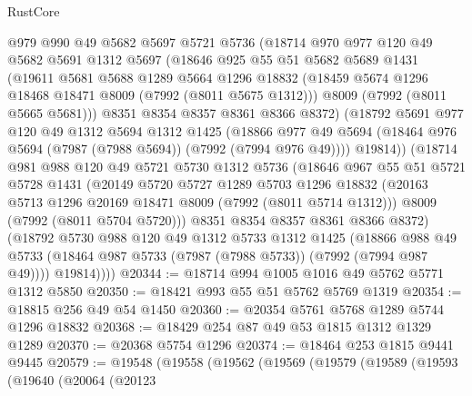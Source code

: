 \begin{lexlean}{RustCore}
\begin{coremodule}
        @979
        @990
        @49
        @5682
        @5697
        @5721
        @5736
        (@18714
          @970
          @977
          @120
          @49
          @5682
          @5691
          @1312
          @5697
          (@18646
            @925
            @55
            @51
            @5682
            @5689
            @1431
            (@19611
              @5681
              @5688
              @1289
              @5664
              @1296
              @18832
              (@18459 @5674 @1296 @18468 @18471 @8009 (@7992 (@8011 @5675 @1312)))
              @8009
              (@7992 (@8011 @5665 @5681)))
            @8351
            @8354
            @8357
            @8361
            @8366
            @8372)
          (@18792
            @5691
            @977
            @120
            @49
            @1312
            @5694
            @1312
            @1425
            (@18866
              @977
              @49
              @5694
              (@18464 @976 @5694 (@7987 (@7988 @5694)) (@7992 (@7994 @976 @49))))
            @19814))
        (@18714
          @981
          @988
          @120
          @49
          @5721
          @5730
          @1312
          @5736
          (@18646
            @967
            @55
            @51
            @5721
            @5728
            @1431
            (@20149
              @5720
              @5727
              @1289
              @5703
              @1296
              @18832
              (@20163 @5713 @1296 @20169 @18471 @8009 (@7992 (@8011 @5714 @1312)))
              @8009
              (@7992 (@8011 @5704 @5720)))
            @8351
            @8354
            @8357
            @8361
            @8366
            @8372)
          (@18792
            @5730
            @988
            @120
            @49
            @1312
            @5733
            @1312
            @1425
            (@18866
              @988
              @49
              @5733
              (@18464 @987 @5733 (@7987 (@7988 @5733)) (@7992 (@7994 @987 @49))))
            @19814))))
@20344 := @18714 @994 @1005 @1016 @49 @5762 @5771 @1312 @5850
@20350 := @18421 @993 @55 @51 @5762 @5769 @1319
@20354 := @18815 @256 @49 @54 @1450
@20360 := @20354 @5761 @5768 @1289 @5744 @1296 @18832
@20368 := @18429 @254 @87 @49 @53 @1815 @1312 @1329 @1289
@20370 := @20368 @5754 @1296
@20374 := @18464 @253 @1815 @9441 @9445
@20579 := @19548
    (@19558
      (@19562
        (@19569
          (@19579
            (@19589
              (@19593
                (@19640
                  (@20064
                    (@20123

\end{coremodule}
\end{lexlean}
